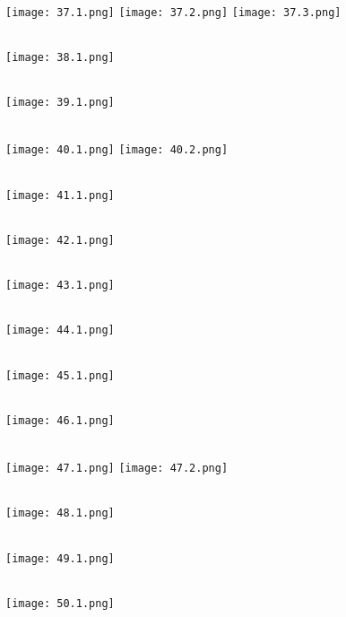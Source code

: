 \documentclass[a4paper,14pt]{extreport}
\begin{document}
\begin{landscape}


\hypertarget{3v}{}\\[1cm]
\texttt{[image: 37.1.png]}
\texttt{[image: 37.2.png]}
\texttt{[image: 37.3.png]}

\hypertarget{4v}{}\\[1cm]
\texttt{[image: 38.1.png]}


\hypertarget{5v}{}\\[1cm]
\texttt{[image: 39.1.png]}

\hypertarget{6v}{}\\[1cm]
\texttt{[image: 40.1.png]}
\texttt{[image: 40.2.png]}

\hypertarget{7v}{}\\[1cm]
\texttt{[image: 41.1.png]}

\hypertarget{8v}{}\\[1cm]
\texttt{[image: 42.1.png]}

\hypertarget{9v}{}\\[1cm]
\texttt{[image: 43.1.png]}

\hypertarget{10v}{}\\[1cm]
\texttt{[image: 44.1.png]}

\hypertarget{11v}{}\\[1cm]
\texttt{[image: 45.1.png]}

\hypertarget{12v}{}\\[1cm]
\texttt{[image: 46.1.png]}


\hypertarget{13v}{}\\[1cm]
\texttt{[image: 47.1.png]}
\texttt{[image: 47.2.png]}

\hypertarget{14v}{}\\[1cm]
\texttt{[image: 48.1.png]}

\hypertarget{15v}{}\\[1cm]
\texttt{[image: 49.1.png]}


\hypertarget{16v}{}\\[1cm]
\texttt{[image: 50.1.png]}


\end{landscape}
\end{document}
